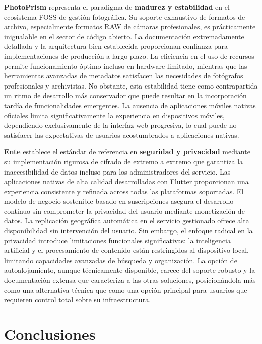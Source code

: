 \textbf{PhotoPrism} representa el paradigma de \textbf{madurez y estabilidad} en el ecosistema FOSS de gestión fotográfica. Su soporte exhaustivo de formatos de archivo, especialmente formatos RAW de cámaras profesionales, es prácticamente inigualable en el sector de código abierto. La documentación extremadamente detallada y la arquitectura bien establecida proporcionan confianza para implementaciones de producción a largo plazo. La eficiencia en el uso de recursos permite funcionamiento óptimo incluso en hardware limitado, mientras que las herramientas avanzadas de metadatos satisfacen las necesidades de fotógrafos profesionales y archivistas. No obstante, esta estabilidad tiene como contrapartida un ritmo de desarrollo más conservador que puede resultar en la incorporación tardía de funcionalidades emergentes. La ausencia de aplicaciones móviles nativas oficiales limita significativamente la experiencia en dispositivos móviles, dependiendo exclusivamente de la interfaz web progresiva, lo cual puede no satisfacer las expectativas de usuarios acostumbrados a aplicaciones nativas.

\textbf{Ente} establece el estándar de referencia en \textbf{seguridad y privacidad} mediante su implementación rigurosa de cifrado de extremo a extremo que garantiza la inaccesibilidad de datos incluso para los administradores del servicio. Las aplicaciones nativas de alta calidad desarrolladas con Flutter proporcionan una experiencia consistente y refinada across todas las plataformas soportadas. El modelo de negocio sostenible basado en suscripciones asegura el desarrollo continuo sin comprometer la privacidad del usuario mediante monetización de datos. La replicación geográfica automática en el servicio gestionado ofrece alta disponibilidad sin intervención del usuario. Sin embargo, el enfoque radical en la privacidad introduce limitaciones funcionales significativas: la inteligencia artificial y el procesamiento de contenido están restringidos al dispositivo local, limitando capacidades avanzadas de búsqueda y organización. La opción de autoalojamiento, aunque técnicamente disponible, carece del soporte robusto y la documentación extensa que caracteriza a las otras soluciones, posicionándola más como una alternativa técnica que como una opción principal para usuarios que requieren control total sobre su infraestructura.

\section{Conclusiones}

